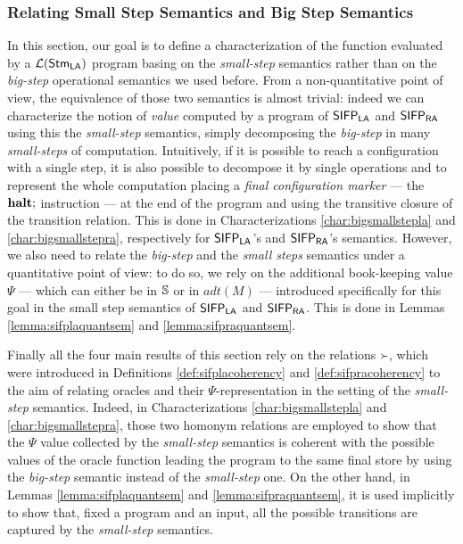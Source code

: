 \subsubsection{Relating Small Step Semantics and Big Step Semantics}
\label{subsub:smallbigeq}

In this section, our goal is to define a characterization of the function evaluated by a
${\mathcal L ({\mathsf{Stm}_{\mathsf{LA}}})}$ program basing on the
\emph{small-step} semantics rather than on the
\emph{big-step} operational semantics we used before.
%
From a non-quantitative point of view, the equivalence of those two semantics
is almost trivial: indeed
we can characterize the notion of \emph{value} computed by a program of $\mathsf{SIFP_{{\mathsf{LA}}}}$ and
$\mathsf{SIFP_{{\mathsf{RA}}}}$ using this the \emph{small-step} semantics, simply decomposing the
\emph{big-step} in many \emph{small-steps} of computation. Intuitively,
if it is possible to reach a configuration with a single step, it is
also possible to decompose it by single operations and to represent the whole
computation placing a \emph{final configuration marker} --- the $\mathbf{halt};$
instruction --- at the end of the program
and using the transitive closure of the transition relation.
This is done in
Characterizations \ref{char:bigsmallstepla} and \ref{char:bigsmallstepra},
respectively for $\mathsf{SIFP_{{\mathsf{LA}}}}$'s and $\mathsf{SIFP_{{\mathsf{RA}}}}$'s semantics.
%
However, we also need to relate the \emph{big-step} and the \emph{small steps}
semantics under a quantitative point of view: to do so, we rely on the additional
book-keeping value $\Psi$ --- which can either be in $\mathbb{S}$ or in $\mathit{adt}(M)$ ---
introduced specifically for this goal in the small step semantics of
$\mathsf{SIFP_{{\mathsf{LA}}}}$ and $\mathsf{SIFP_{{\mathsf{RA}}}}$. This is done in Lemmas \ref{lemma:sifplaquantsem} and
\ref{lemma:sifpraquantsem}.

Finally all the four main results of this section rely on the relations $\Yright$,
which were introduced in Definitions \ref{def:sifplacoherency} and \ref{def:sifpracoherency}
to the aim of relating oracles and their $\Psi$-representation
in the setting of the \emph{small-step} semantics.
%
Indeed, in Characterizations \ref{char:bigsmallstepla} and \ref{char:bigsmallstepra},
those two homonym relations are employed to show that the $\Psi$ value collected by the \emph{small-step}
semantics is coherent with the possible values of the oracle function leading the
program to the same final store by using the \emph{big-step} semantic instead of the \emph{small-step} one.
On the other hand, in Lemmas \ref{lemma:sifplaquantsem} and \ref{lemma:sifpraquantsem},
it is used implicitly to show that, fixed a program and an input, all the possible
transitions are captured by the \emph{small-step} semantics.

